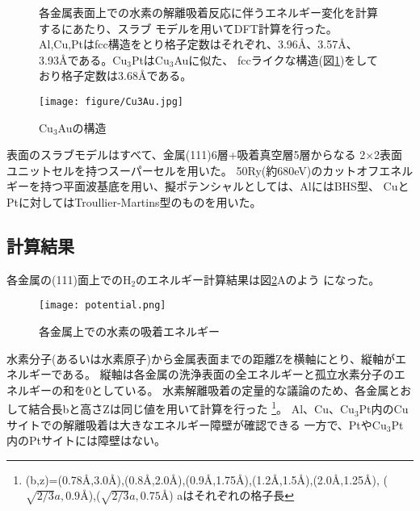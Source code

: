 \documentclass[12pt]{ltjsarticle}
\begin{document}
\begin{figure}[hbtp]
\begin{minipage}{.5\textwidth}
    各金属表面上での水素の解離吸着反応に伴うエネルギー変化を計算するにあたり、スラブ
    モデルを用いてDFT計算を行った。
    Al,Cu,Ptはfcc構造をとり格子定数はそれぞれ、3.96$\mbox{\AA}$、3.57$\mbox{\AA}$、
    3.93$\mbox{\AA}$である。$\text{Cu}_\text{3}$Ptは$\text{Cu}_\text{3}$Auに似た、
    fccライクな構造(図\ref{fig:Cu3Au})をしており格子定数は3.68$\mbox{\AA}$である。
\end{minipage}
\hfill
\begin{minipage}{.45\textwidth}
    \begin{center}
     \texttt{[image: figure/Cu3Au.jpg]}
    \end{center}
    \caption{Cu$_\text{3}$Auの構造}
    \label{fig:Cu3Au}
\end{minipage}
\end{figure}
表面のスラブモデルはすべて、金属(111)6層+吸着真空層5層からなる
2×2表面ユニットセルを持つスーパーセルを用いた。
50Ry(約680eV)のカットオフエネルギーを持つ平面波基底を用い、擬ポテンシャルとしては、AlにはBHS型、
CuとPtに対してはTroullier-Martins型のものを用いた。

\subsection{計算結果}
各金属の(111)面上での$\text{H}_\text{2}$のエネルギー計算結果は図\ref{fig:potential}Aのよう
になった。\\

\begin{figure}[hbtp]
    \begin{center}
     \texttt{[image: potential.png]}
    \end{center}
    \caption{各金属上での水素の吸着エネルギー}
    \label{fig:potential}
\end{figure}
水素分子(あるいは水素原子)から金属表面までの距離Zを横軸にとり、縦軸がエネルギーである。
縦軸は各金属の洗浄表面の全エネルギーと孤立水素分子のエネルギーの和を0としている。
水素解離吸着の定量的な議論のため、各金属とおして結合長bと高さZは同じ値を用いて計算を行った
\footnote{(b,z)=(0.78$\mbox{\AA}$,3.0$\mbox{\AA}$),(0.8$\mbox{\AA}$,2.0$\mbox{\AA}$),(0.9$\mbox{\AA}$,1.75$\mbox{\AA}$),(1.2$\mbox{\AA}$,1.5$\mbox{\AA}$),(2.0$\mbox{\AA}$,1.25$\mbox{\AA}$),
($\sqrt{2/3}a,0.9\mbox{\AA}$),($\sqrt{2/3}a,0.75\mbox{\AA}$) aはそれぞれの格子長}。
Al、Cu、$\text{Cu}_\text{3}$Pt内のCuサイトでの解離吸着は大きなエネルギー障壁が確認できる
一方で、Ptや$\text{Cu}_\text{3}$Pt内のPtサイトには障壁はない。
\end{document}
